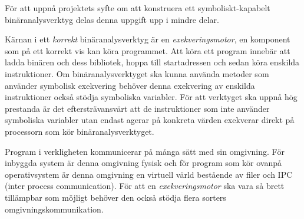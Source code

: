 

För att uppnå projektets syfte om att konstruera ett symboliskt-kapabelt
binäranalysverktyg delas denna uppgift upp i mindre delar.

Kärnan i ett \textit{korrekt} binäranalysverktyg är en
\textit{exekveringsmotor}, en komponent som på ett korrekt vis kan köra
programmet. Att köra ett program innebär att ladda binären och dess bibliotek,
hoppa till startadressen och sedan köra enskilda instruktioner. Om
binäranalysverktyget ska kunna använda metoder som använder symbolisk exekvering
behöver denna exekvering av enskilda instruktioner också stödja symboliska
variabler. För att verktyget ska uppnå hög prestanda är det eftersträvansvärt
att de instruktioner som inte använder symboliska variabler utan endast agerar
på konkreta värden exekverar direkt på processorn som kör binäranalysverktyget.

Program i verkligheten kommunicerar på många sätt med sin omgivning. För
inbyggda system är denna omgivning fysisk och för program som kör ovanpå
operativsystem är denna omgivning en virtuell värld bestående av filer och IPC (inter
process communication). För att en \textit{exekveringsmotor} ska vara så
brett tillämpbar som möjligt behöver den också stödja flera sorters
omgivningskommunikation.

